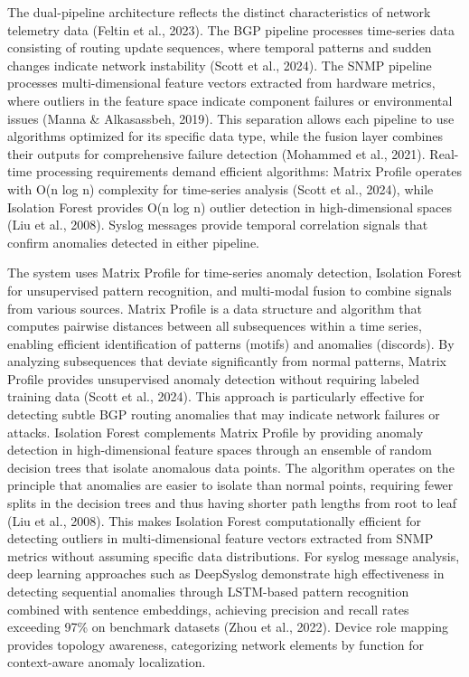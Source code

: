 \documentclass[11pt]{article}
\begin{document}
The dual-pipeline architecture reflects the distinct characteristics of network telemetry data (Feltin et al., 2023). The BGP pipeline processes time-series data consisting of routing update sequences, where temporal patterns and sudden changes indicate network instability (Scott et al., 2024). The SNMP pipeline processes multi-dimensional feature vectors extracted from hardware metrics, where outliers in the feature space indicate component failures or environmental issues (Manna \& Alkasassbeh, 2019). This separation allows each pipeline to use algorithms optimized for its specific data type, while the fusion layer combines their outputs for comprehensive failure detection (Mohammed et al., 2021). Real-time processing requirements demand efficient algorithms: Matrix Profile operates with O(n log n) complexity for time-series analysis (Scott et al., 2024), while Isolation Forest provides O(n log n) outlier detection in high-dimensional spaces (Liu et al., 2008). Syslog messages provide temporal correlation signals that confirm anomalies detected in either pipeline.

The system uses Matrix Profile for time-series anomaly detection, Isolation Forest for unsupervised pattern recognition, and multi-modal fusion to combine signals from various sources. Matrix Profile is a data structure and algorithm that computes pairwise distances between all subsequences within a time series, enabling efficient identification of patterns (motifs) and anomalies (discords). By analyzing subsequences that deviate significantly from normal patterns, Matrix Profile provides unsupervised anomaly detection without requiring labeled training data (Scott et al., 2024). This approach is particularly effective for detecting subtle BGP routing anomalies that may indicate network failures or attacks. Isolation Forest complements Matrix Profile by providing anomaly detection in high-dimensional feature spaces through an ensemble of random decision trees that isolate anomalous data points. The algorithm operates on the principle that anomalies are easier to isolate than normal points, requiring fewer splits in the decision trees and thus having shorter path lengths from root to leaf (Liu et al., 2008). This makes Isolation Forest computationally efficient for detecting outliers in multi-dimensional feature vectors extracted from SNMP metrics without assuming specific data distributions. For syslog message analysis, deep learning approaches such as DeepSyslog demonstrate high effectiveness in detecting sequential anomalies through LSTM-based pattern recognition combined with sentence embeddings, achieving precision and recall rates exceeding 97\% on benchmark datasets (Zhou et al., 2022). Device role mapping provides topology awareness, categorizing network elements by function for context-aware anomaly localization.
\end{document}
